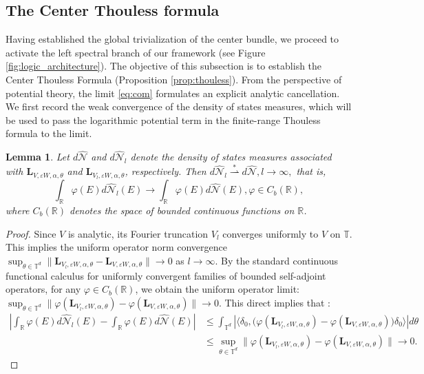 \documentclass[reqno,11pt]{amsart}
\newtheorem{lemma}{Lemma}[section]
\begin{document}
\subsection{The Center Thouless formula}

Having established the global trivialization of the center bundle, we proceed to activate the left spectral branch of our framework (see Figure \ref{fig:logic_architecture}). The objective of this subsection is to establish the Center Thouless Formula  (Proposition \ref{prop:thouless}). From the perspective of potential theory, the limit \eqref{eq:com} formulates an explicit analytic cancellation. We first record the weak convergence of the density of
states measures, which will be used to pass the logarithmic potential term in
the finite-range Thouless formula to the limit.








\begin{lemma}\label{lemma:IDSweak}
Let $d \widehat{\mathcal{N}}$ and $d\widehat{\mathcal{N}}_l$ denote the density of states measures associated with
$\mathbf{L}_{V,\varepsilon W,\alpha,\theta}$ and $\mathbf{L}_{V_l,\varepsilon W,\alpha,\theta}$, respectively.
Then
$
d\widehat{\mathcal{N}}_l \overset{*}{\rightharpoonup} d \widehat{\mathcal{N}}, l\to\infty,
$
that is,
$$
\int_{\mathbb R}\varphi(E)d\widehat{\mathcal{N}}_l(E)
\longrightarrow
\int_{\mathbb R}\varphi(E)d \widehat{\mathcal{N}}(E), \varphi\in C_b(\mathbb R),
$$
where $C_b(\mathbb R)$ denotes the space of bounded continuous functions on $\mathbb R$.
\end{lemma}
\begin{proof}Since $V$ is analytic, its Fourier truncation $V_l$ converges uniformly to $V$ on $\mathbb{T}$. This implies  the uniform operator norm convergence $\sup_{\theta\in\mathbb{T}^d} \|\mathbf{L}_{V_l,\varepsilon W,\alpha,\theta} - \mathbf{L}_{V,\varepsilon W,\alpha,\theta}\| \to 0$ as $l \to \infty$. By the standard continuous functional calculus for uniformly convergent families of bounded self-adjoint operators, for any $\varphi \in C_b(\mathbb{R})$, we obtain the uniform operator limit:$\sup_{\theta\in\mathbb{T}^d} \|\varphi(\mathbf{L}_{V_l,\varepsilon W,\alpha,\theta}) - \varphi(\mathbf{L}_{V,\varepsilon W,\alpha,\theta})\| \to 0.$ This direct implies that :$$\begin{aligned}
\left|\int_{\mathbb{R}}\varphi(E)d\widehat{\mathcal{N}}_l(E) - \int_{\mathbb{R}}\varphi(E)d\widehat{\mathcal{N}}(E)\right|
&\leq \int_{\mathbb{T}^d}\left|\bigl\langle\delta_0,\bigl(\varphi(\mathbf{L}_{V_l,\varepsilon W,\alpha,\theta}) - \varphi(\mathbf{L}_{V,\varepsilon W,\alpha,\theta})\bigr)\delta_0\bigr\rangle\right|d\theta\\
&\leq \sup_{\theta\in\mathbb{T}^d}\|\varphi(\mathbf{L}_{V_l,\varepsilon W,\alpha,\theta}) - \varphi(\mathbf{L}_{V,\varepsilon W,\alpha,\theta})\| \to 0.
\end{aligned}$$\end{proof}
\end{document}

